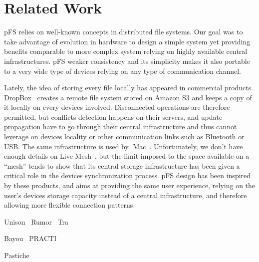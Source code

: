 
\section{Related Work}
\label{s:related}


pFS relies on well-known concepts in distributed file systems. Our
goal was to take advantage of evolution in hardware to design a simple
system yet providing benefits comparable to more complex system
relying on highly available central infrastructures. pFS weaker
consistency and its simplicity makes it also portable to a very wide
type of devices relying on any type of communication channel.

Lately, the idea of storing every file locally has appeared in
commercial products. DropBox~\cite{houston:dropbox} creates a remote
file system stored on Amazon S3 and keeps a copy of it locally on
every devices involved. Disconnected operations are therefore
permitted, but conflicts detection happens on their servers, and
update propagation have to go through their central infrastructure and
thus cannot leverage on devices locality or other communication links
such as Bluetooth or USB. The same infrastructure is used by
.Mac~\cite{apple:mac}. Unfortunately, we don't have enough details on
Live Mesh~\cite{microsoft:livemesh}, but the limit imposed to the space
available on a ``mesh'' tends to show that its central storage
infrastructure has been given a critical role in the devices
synchronization process. pFS design has been inspired by these
products, and aims at providing the same user experience, relying on
the user's devices storage capacity instead of a central
infrastructure, and therefore allowing more flexible connection
patterns.

Unison~\cite{balasubramanian:unison}
Rumor~\cite{guy:rumor}
Tra~\cite{cox:tra}

Bayou~\cite{petersen:flexible-update}
PRACTI~\cite{belaramani:pract}

Pastiche~\cite{cox:pastiche,nguyen:friendstore}


